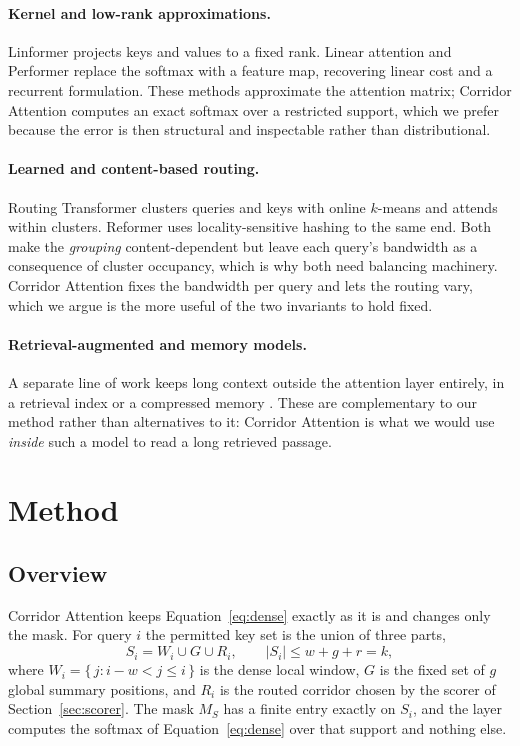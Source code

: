 \documentclass[11pt]{article}
\begin{document}
\paragraph{Kernel and low-rank approximations.} Linformer
\citep{wang2020linformer} projects keys and values to a fixed rank. Linear
attention \citep{katharopoulos2020linear} and Performer
\citep{choromanski2021performer} replace the softmax with a feature map,
recovering linear cost and a recurrent formulation. These methods approximate
the attention matrix; Corridor Attention computes an exact softmax over a
restricted support, which we prefer because the error is then structural and
inspectable rather than distributional.

\paragraph{Learned and content-based routing.} Routing Transformer
\citep{roy2021efficient} clusters queries and keys with online $k$-means and
attends within clusters. Reformer \citep{kitaev2020reformer} uses
locality-sensitive hashing to the same end. Both make the \emph{grouping}
content-dependent but leave each query's bandwidth as a consequence of cluster
occupancy, which is why both need balancing machinery. Corridor Attention fixes
the bandwidth per query and lets the routing vary, which we argue is the more
useful of the two invariants to hold fixed.

\paragraph{Retrieval-augmented and memory models.} A separate line of work
keeps long context outside the attention layer entirely, in a retrieval index
or a compressed memory \citep{rae2020compressive,borgeaud2022improving}. These
are complementary to our method rather than alternatives to it: Corridor
Attention is what we would use \emph{inside} such a model to read a long
retrieved passage.

\section{Method}\label{sec:method}

\subsection{Overview}\label{sec:overview}

Corridor Attention keeps Equation~\eqref{eq:dense} exactly as it is and
changes only the mask. For query $i$ the permitted key set is the union of
three parts,
\begin{equation}\label{eq:support}
  S_i = W_i \cup G \cup R_i, \qquad |S_i| \le w + g + r = k,
\end{equation}
where $W_i = \{\, j : i - w < j \le i \,\}$ is the dense local window, $G$ is
the fixed set of $g$ global summary positions, and $R_i$ is the routed
corridor chosen by the scorer of Section~\ref{sec:scorer}. The mask $M_S$ has
a finite entry exactly on $S_i$, and the layer computes the softmax of
Equation~\eqref{eq:dense} over that support and nothing else.
\end{document}
